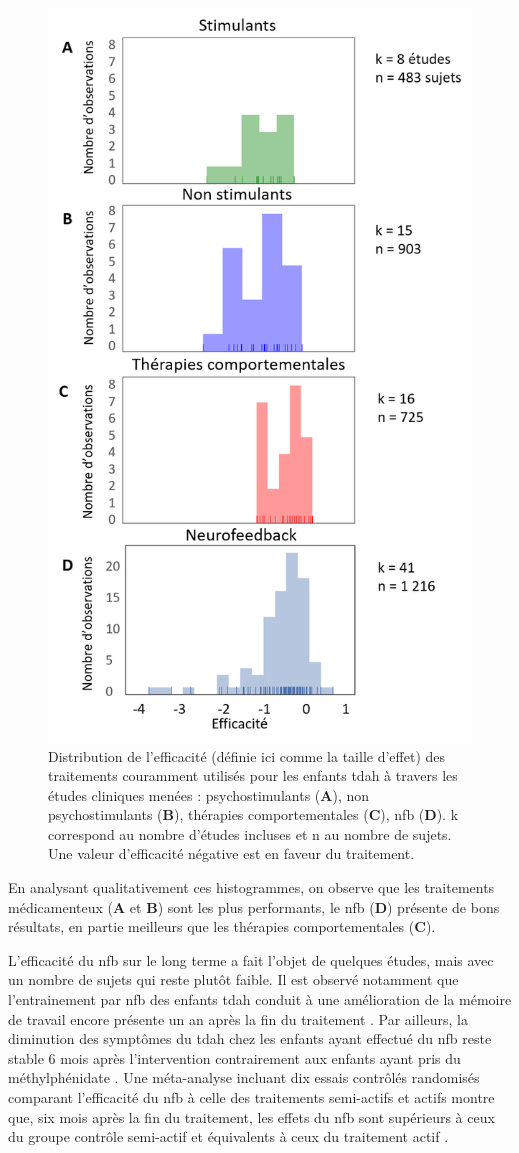 \begin{figure}[h!]
  \centering
	\includegraphics[width=0.5\linewidth]{figures/chapter-1/introduction-efficacy-treatments} 
  \caption[Visualisation de l'efficacité des traitement couramment utilisés dans le cadre du \gls{tdah}.]{Distribution de l'efficacité (définie ici comme la taille d'effet) 
	des traitements couramment utilisés pour les enfants \gls{tdah} à travers les études cliniques menées : 
	psychostimulants (\textbf{A}), non psychostimulants (\textbf{B}), thérapies comportementales (\textbf{C}), \gls{nfb} (\textbf{D}). k correspond au nombre
	d'études incluses et n au nombre de sujets. Une valeur d'efficacité négative est en faveur du traitement.}
  \label{Figure:introduction-efficacy-treatments}
\end{figure}

En analysant qualitativement ces histogrammes, on observe que les traitements médicamenteux (\textbf{A} et \textbf{B}) sont les plus performants, le \gls{nfb} (\textbf{D}) présente de bons
résultats, en partie meilleurs que les thérapies comportementales (\textbf{C}). 

L'efficacité du \gls{nfb} sur le long terme a fait l'objet de quelques études, mais avec un nombre de sujets qui reste plutôt faible. Il est observé notamment
que l'entrainement par \gls{nfb} des enfants \gls{tdah} conduit à une amélioration de la mémoire de travail encore présente un an après la fin du traitement
\citep{Dobrakowski2019}. Par ailleurs, la diminution des symptômes du \gls{tdah} chez les enfants ayant effectué du \gls{nfb} reste stable 6 mois après 
l'intervention contrairement aux enfants ayant pris du méthylphénidate \citep{Gelade2018}. Une méta-analyse incluant dix essais contrôlés randomisés comparant l'efficacité du \gls{nfb}
à celle des traitements semi-actifs et actifs montre que, six mois après la fin du traitement, les effets du \gls{nfb} sont supérieurs à ceux du groupe contrôle semi-actif
et équivalents à ceux du traitement actif \citep{VanDoren2019}.  

